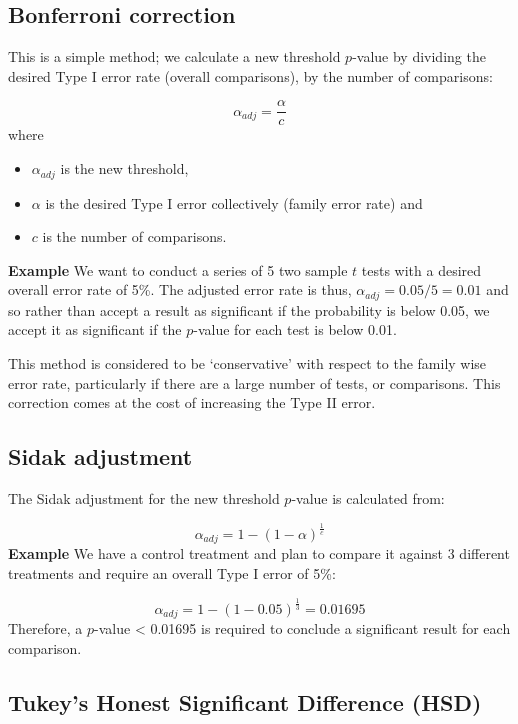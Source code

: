 \documentclass[
  oneside]{krantz}
\providecommand{\tightlist}{%
  \setlength{\itemsep}{0pt}\setlength{\parskip}{0pt}}
\begin{document}
\hypertarget{bonferroni-correction}{%
\subsection{Bonferroni correction}\label{bonferroni-correction}}

This is a simple method; we calculate a new threshold \(p\)-value by dividing the desired Type I error rate (overall comparisons), by the number of comparisons:

\[\alpha_{adj} = \frac{\alpha}{c}\]
where

\begin{itemize}
\tightlist
\item
  \(\alpha_{adj}\) is the new threshold,
\item
  \(\alpha\) is the desired Type I error collectively (family error rate) and
\item
  \(c\) is the number of comparisons.
\end{itemize}

\textbf{Example} We want to conduct a series of 5 two sample \(t\) tests with a desired overall error rate of 5\%. The adjusted error rate is thus, \(\alpha_{adj} = 0.05/5 = 0.01\) and so rather than accept a result as significant if the probability is below 0.05, we accept it as significant if the \(p\)-value for each test is below 0.01.

This method is considered to be `conservative' with respect to the family wise error rate, particularly if there are a large number of tests, or comparisons. This correction comes at the cost of increasing the Type II error.

\hypertarget{sidak-adjustment}{%
\subsection{Sidak adjustment}\label{sidak-adjustment}}

The Sidak adjustment for the new threshold \(p\)-value is calculated from:

\[\alpha_{adj} = 1 - (1-\alpha)^{\frac{1}{c}}\]
\textbf{Example} We have a control treatment and plan to compare it against 3 different treatments and require an overall Type I error of 5\%:

\[\alpha_{adj} = 1 - (1 - 0.05)^{\frac{1}{3}}=0.01695\]
Therefore, a \(p\)-value \textless{} 0.01695 is required to conclude a significant result for each comparison.

\hypertarget{tukeys-honest-significant-difference-hsd}{%
\subsection{Tukey's Honest Significant Difference (HSD)}\label{tukeys-honest-significant-difference-hsd}}
\end{document}
